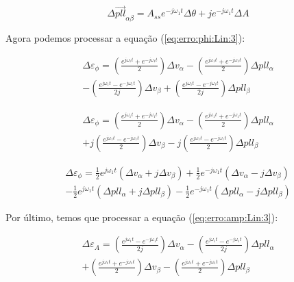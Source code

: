 \documentclass[12pt,a4paper]{report}
\begin{document}
\begin{equation}
\Delta \vec{pll}_{\alpha\beta} =
A_{ss} e^{-j\omega_1 t} \Delta \theta
+j e^{-j\omega_1 t} \Delta A
\end{equation}




Agora podemos processar a equação (\ref{eq:erro:phi:Lin:3}):

{
\color{blue}

\begin{multline}
\Delta \varepsilon_\phi = 
\left(
\frac{e^{j\omega_1 t} + e^{-j\omega_1 t}}{2}
\right)
\Delta v_{\alpha} 
- \left(
\frac{e^{j\omega_1 t} + e^{-j\omega_1 t}}{2}
\right)
\Delta pll_\alpha \\
- \left(
\frac{e^{j\omega_1 t} - e^{-j\omega_1 t}}{2j}
\right) 
\Delta v_\beta 
+ \left(
\frac{e^{j\omega_1 t} - e^{-j\omega_1 t}}{2j}
\right) 
\Delta pll_\beta
\end{multline}


\begin{multline}
\Delta \varepsilon_\phi = 
\left(
\frac{e^{j\omega_1 t} + e^{-j\omega_1 t}}{2}
\right)
\Delta v_{\alpha} 
- \left(
\frac{e^{j\omega_1 t} + e^{-j\omega_1 t}}{2}
\right)
\Delta pll_\alpha \\
+ j\left(
\frac{e^{j\omega_1 t} - e^{-j\omega_1 t}}{2}
\right) 
\Delta v_\beta 
- j\left(
\frac{e^{j\omega_1 t} - e^{-j\omega_1 t}}{2}
\right) 
\Delta pll_\beta
\end{multline}



\begin{multline}
\Delta \varepsilon_\phi =
\frac{1}{2} e^{j\omega_1 t}
( \Delta v_{\alpha}  + j\Delta v_{\beta} )
+\frac{1}{2} e^{-j\omega_1 t}
( \Delta v_{\alpha}  - j\Delta v_{\beta} )\\
-\frac{1}{2} e^{j\omega_1 t}
( \Delta pll_{\alpha}  + j\Delta pll_{\beta} )
-\frac{1}{2} e^{-j\omega_1 t}
( \Delta pll_{\alpha}  - j\Delta pll_{\beta} )
\end{multline}





}




Por último, temos que processar a equação (\ref{eq:erro:amp:Lin:3}):


{

\color{blue}

\begin{multline}
\Delta\varepsilon_A =
\left(
\frac{e^{j\omega_1 t} - e^{-j\omega_1 t}}{2j}
\right) 
\Delta v_\alpha 
- \left(
\frac{e^{j\omega_1 t} - e^{-j\omega_1 t}}{2j}
\right)
\Delta pll_\alpha \\
+ \left(
\frac{e^{j\omega_1 t} + e^{-j\omega_1 t}}{2}
\right) 
\Delta v_\beta 
- \left(
\frac{e^{j\omega_1 t} + e^{-j\omega_1 t}}{2}
\right) 
\Delta pll_\beta
\end{multline}

}
\end{document}
